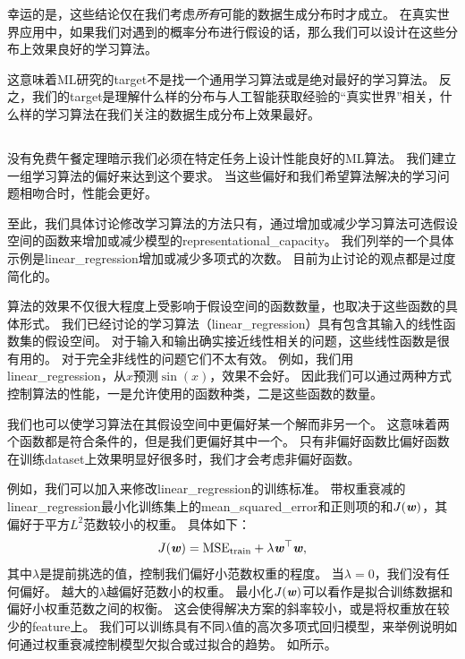 
幸运的是，这些结论仅在我们考虑\emph{所有}可能的数据生成分布时才成立。
在真实世界应用中，如果我们对遇到的概率分布进行假设的话，那么我们可以设计在这些分布上效果良好的学习算法。

这意味着\gls{ML}研究的\gls{target}不是找一个通用学习算法或是绝对最好的学习算法。
反之，我们的\gls{target}是理解什么样的分布与人工智能获取经验的``真实世界''相关，什么样的学习算法在我们关注的数据生成分布上效果最好。

\subsection{}
\label{sec:regularization}
没有免费午餐定理暗示我们必须在特定任务上设计性能良好的\gls{ML}算法。
我们建立一组学习算法的偏好来达到这个要求。
当这些偏好和我们希望算法解决的学习问题相吻合时，性能会更好。

至此，我们具体讨论修改学习算法的方法只有，通过增加或减少学习算法可选假设空间的函数来增加或减少模型的\gls{representational_capacity}。
我们列举的一个具体示例是\gls{linear_regression}增加或减少多项式的次数。
目前为止讨论的观点都是过度简化的。

算法的效果不仅很大程度上受影响于假设空间的函数数量，也取决于这些函数的具体形式。
我们已经讨论的学习算法（\gls{linear_regression}）具有包含其输入的线性函数集的假设空间。
对于输入和输出确实接近线性相关的问题，这些线性函数是很有用的。
对于完全非线性的问题它们不太有效。
例如，我们用\gls{linear_regression}，从$x$预测$\sin(x)$，效果不会好。
因此我们可以通过两种方式控制算法的性能，一是允许使用的函数种类，二是这些函数的数量。

我们也可以使学习算法在其假设空间中更偏好某一个解而非另一个。
这意味着两个函数都是符合条件的，但是我们更偏好其中一个。
只有非偏好函数比偏好函数在训练\gls{dataset}上效果明显好很多时，我们才会考虑非偏好函数。


例如，我们可以加入来修改\gls{linear_regression}的训练标准。
带权重衰减的\gls{linear_regression}最小化训练集上的\gls{mean_squared_error}和正则项的和$J(\boldsymbol{\mathit{w}})$，其偏好于平方$L^2$范数较小的权重。
具体如下：
\begin{equation}
    J(\boldsymbol{\mathit{w}}) = \text{MSE}_{\text{train}} + \lambda \boldsymbol{\mathit{w}}^\top \boldsymbol{\mathit{w}},
\end{equation}
其中$\lambda$是提前挑选的值，控制我们偏好小范数权重的程度。
当$\lambda =0$，我们没有任何偏好。
越大的$\lambda$越偏好范数小的权重。
最小化$J(\boldsymbol{\mathit{w}})$可以看作是拟合训练数据和偏好小权重范数之间的权衡。
这会使得解决方案的斜率较小，或是将权重放在较少的\gls{feature}上。
我们可以训练具有不同$\lambda$值的高次多项式回归模型，来举例说明如何通过权重衰减控制模型欠拟合或过拟合的趋势。
如所示。

